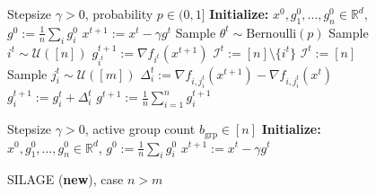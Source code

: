 \documentclass{article}
\newcommand{\eqdef}{:=}
\theoremstyle{plain}
\newcommand{\algname}[1]{{\sf\scalefont{0.88}\color{mydarkgreen}#1}\xspace}
\def\algname#1{#1}%
\begin{document}
\begin{figure}[t]
\centering
\begin{minipage}[t]{0.485\textwidth}
\begin{algorithm}[H]
\small
\caption{\algname{SILAGE} (\textbf{new}), case $m\geq n$}
\label{algsilage1}
\begin{algorithmic}[1]
    \REQUIRE Stepsize $\gamma > 0$, probability $p \in (0,1]$
    \STATE \textbf{Initialize:} $x^0, g_1^0, \ldots, g_n^0 \in \mathbb{R}^d$,  $g^0 \eqdef \frac{1}{n}\sum_{i} g_i^0$
        \STATE $x^{t+1} \eqdef x^t - \gamma g^t$
        \STATE Sample $\theta^t \sim \text{Bernoulli}(p)$
            \STATE Sample $i^t \sim \mathcal{U}([n])$
            \STATE $g_{i^t}^{t+1} \eqdef  \nabla f_{i^t}(x^{t+1})$ \hfill {}
            \STATE $\mathcal{I}^t \eqdef  [n] \setminus \{i^t\}$
        \ELSE
            \STATE $\mathcal{I}^t \eqdef  [n]$
        \ENDIF
            \STATE Sample $j_i^t \sim \mathcal{U}([m])$
            \STATE $\Delta_i^t \eqdef  \nabla f_{i,j_i^t}(x^{t+1}) - \nabla f_{i,j_i^t}(x^t)$
            \STATE $g_i^{t+1} \eqdef  g_i^t + \Delta_i^t$ \hfill {}
        \ENDFOR
        \STATE $g^{t+1} \eqdef  \frac{1}{n}\sum_{i=1}^n g_i^{t+1}$
    \ENDFOR
\end{algorithmic}
\end{algorithm}
\end{minipage}\hfill
\begin{minipage}[t]{0.485\textwidth}
\begin{algorithm}[H]
\small
\caption{\algname{SILAGE} (\textbf{new}), case $n>m$}
\label{algsilage2a}
\begin{algorithmic}[1]
    \REQUIRE Stepsize $\gamma > 0$, active group count $b_{\mathrm{grp}} \in [n]$
   \STATE \textbf{Initialize:} $x^0, g_1^0, \ldots, g_n^0 \in \mathbb{R}^d$,  $g^0 \eqdef \frac{1}{n}\sum_{i} g_i^0$
        \STATE $x^{t+1} \eqdef x^t - \gamma g^t$

\end{algorithmic}
\end{algorithm}
\end{minipage}
\end{figure}
\end{document}
